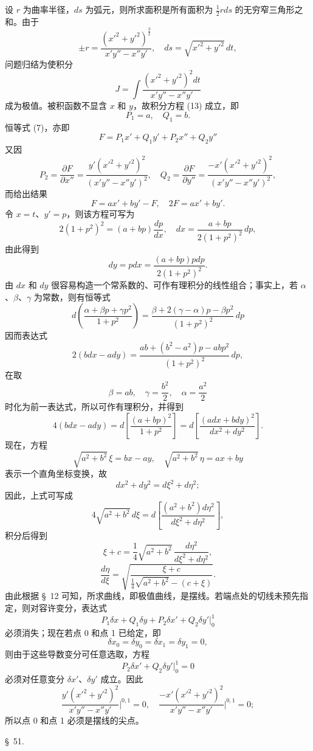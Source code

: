 \documentclass[11pt,a4paper,leqno]{article}
\begin{document}
设 $r$ 为曲率半径，$ds$ 为弧元，则所求面积是所有面积为 $\frac12 rds$ 的无穷窄三角形之和。由于
\[
\pm r=\frac{(x'^2+y'^2)^{\frac32}}{x'y''-x''y'},\quad ds=\sqrt{x'^2+y'^2}\,dt,
\]
问题归结为使积分
\[
J=\int\frac{(x'^2+y'^2)^2dt}{x'y''-x''y'}
\]
成为极值。被积函数不显含 $x$ 和 $y$，故积分方程 (13) 成立，即
\[
P_1=a,\quad Q_1=b.
\]
恒等式 (7)，亦即
\[
F=P_1x'+Q_1y'+P_2x''+Q_2y''
\]
又因
\[
P_2=\frac{\partial F}{\partial x''}=\frac{y'(x'^2+y'^2)^2}{(x'y''-x''y')^2},\quad
Q_2=\frac{\partial F}{\partial y''}=\frac{-x'(x'^2+y'^2)^2}{(x'y''-x''y')^2},
\]
而给出结果
\[
F=ax'+by'-F,\quad 2F=ax'+by'.
\]
令 $x=t$、$y'=p$，则该方程可写为
\[
2(1+p^2)^2=(a+bp)\frac{dp}{dx},\quad dx=\frac{a+bp}{2(1+p^2)^2}\,dp,
\]
由此得到
\[
dy=pdx=\frac{(a+bp)pdp}{2(1+p^2)^2}.
\]
由 $dx$ 和 $dy$ 很容易构造一个常系数的、可作有理积分的线性组合；事实上，若 $\alpha$、$\beta$、$\gamma$ 为常数，则有恒等式
\[
d\left(\frac{\alpha+\beta p+\gamma p^2}{1+p^2}\right)
=\frac{\beta+2(\gamma-\alpha)p-\beta p^2}{(1+p^2)^2}\,dp
\]
因而表达式
\[
2(bdx-ady)=\frac{ab+(b^2-a^2)p-abp^2}{(1+p^2)^2}\,dp,
\]
在取
\[
\beta=ab,\quad \gamma=\frac{b^2}{2},\quad \alpha=\frac{a^2}{2}
\]
时化为前一表达式，所以可作有理积分，并得到
\[
4(bdx-ady)=d\left[\frac{(a+bp)^2}{1+p^2}\right]
=d\left[\frac{(adx+bdy)^2}{dx^2+dy^2}\right].
\]
现在，方程
\[
\sqrt{a^2+b^2}\,\xi=bx-ay,
\quad
\sqrt{a^2+b^2}\,\eta=ax+by
\]
表示一个直角坐标变换，故
\[
dx^2+dy^2=d\xi^2+d\eta^2;
\]
因此，上式可写成
\[
4\sqrt{a^2+b^2}\,d\xi=d\left[\frac{(a^2+b^2)d\eta^2}{d\xi^2+d\eta^2}\right],
\]
积分后得到
\[
\xi+c=\frac14\sqrt{a^2+b^2}\,\frac{d\eta^2}{d\xi^2+d\eta^2},
\]
\[
\frac{d\eta}{d\xi}=\sqrt{\frac{\xi+c}{\frac14\sqrt{a^2+b^2}-(c+\xi)}}.
\]
由此根据 \S~12 可知，所求曲线，即极值曲线，是摆线。若端点处的切线未预先指定，则对容许变分，表达式
\[
P_1\delta x+Q_1\delta y+P_2\delta x'+Q_2\delta y'\bigg|_0^1
\]
必须消失；现在若点 0 和点 1 已给定，即
\[
\delta x_0=\delta y_0=\delta x_1=\delta y_1=0,
\]
则由于这些导数变分可任意选取，方程
\[
P_2\delta x'+Q_2\delta y'\bigg|_0^1=0
\]
必须对任意变分 $\delta x'$、$\delta y'$ 成立。因此
\[
\frac{y'(x'^2+y'^2)^2}{x'y''-x''y'}\bigg|^{0,1}=0,
\quad
\frac{-x'(x'^2+y'^2)^2}{x'y''-x''y'}\bigg|^{0,1}=0;
\]
所以点 0 和点 1 必须是摆线的尖点。

\begin{center}
{\large \S~51.}
\end{center}
\end{document}
